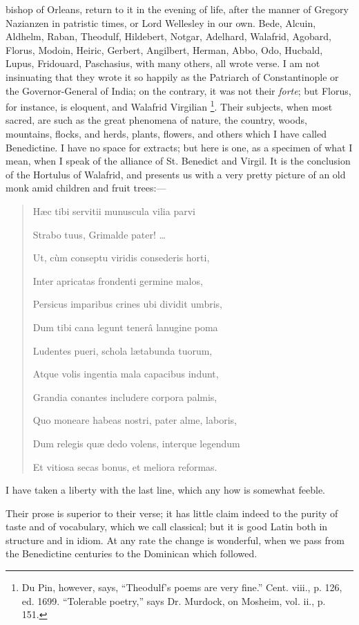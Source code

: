 bishop of Orleans, return to it in the evening of life, after the
manner of Gregory Nazianzen in patristic times, or Lord Wellesley in
our own. Bede, Alcuin, Aldhelm, Raban, Theodulf, Hildebert, Notgar,
Adelhard, Walafrid, Agobard, Florus, Modoin, Heiric, Gerbert,
Angilbert, Herman, Abbo, Odo, Hucbald, Lupus, Fridouard, Paschasius,
with many others, all wrote verse. I am not insinuating that they
wrote it so happily as the Patriarch of Constantinople or the
Governor-General of India; on the contrary, it was not their \emph{forte};
but Florus, for instance, is eloquent, and Walafrid Virgilian \footnote{Du Pin,
however, says, ``Theodulf's poems are very fine.'' Cent.
viii., p. 126, ed. 1699. ``Tolerable poetry,'' says Dr.
Murdock, on Mosheim, vol. ii., p. 151.}. Their subjects, when most sacred, are such as the great
phenomena of nature, the country, woods, mountains, flocks, and herds,
plants, flowers, and others which I have called Benedictine. I have no
space for extracts; but here is one, as a specimen of what I mean,
when I speak of the alliance of St. Benedict and Virgil. It is the
conclusion of the Hortulus of Walafrid, and presents us with a very
pretty picture of an old monk amid children and fruit trees:—

\begin{quote}

Hæc tibi servitii munuscula vilia parvi

Strabo tuus, Grimalde pater! …

Ut, cùm conseptu viridis consederis horti,

Inter apricatas frondenti germine malos,

Persicus imparibus crines ubi dividit umbris,

Dum tibi cana legunt tenerâ lanugine poma 

Ludentes pueri, schola lætabunda tuorum,

Atque volis ingentia mala capacibus indunt,

Grandia conantes includere corpora palmis,

Quo moneare habeas nostri, pater alme, laboris,

Dum relegis quæ dedo volens, interque legendum

Et vitiosa secas bonus, et meliora reformas.

\end{quote}

I have taken a liberty with the last line, which any how is
somewhat feeble.

Their prose is superior to their verse; it has little claim indeed
to the purity of taste and of vocabulary, which we call classical; but
it is good Latin both in structure and in idiom. At any rate the
change is wonderful, when we pass from the Benedictine centuries to
the Dominican which followed.


